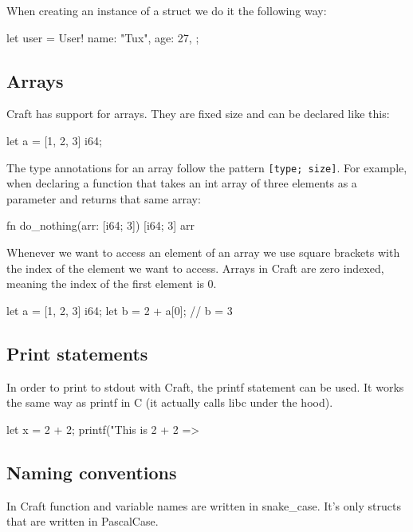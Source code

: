 ﻿\documentclass[10pt,a4paper,twocolumn,twoside]{article}
\begin{document}
When creating an instance of a struct we do it the following way:

\begin{code}
    let user = User!{
        name: "Tux",
        age: 27,
    };
\end{code}

\subsection{Arrays}
Craft has support for arrays. They are fixed size and can be declared like this:

\begin{code}
let a = [1, 2, 3] i64;
\end{code}

The type annotations for an array follow the pattern \texttt{[type; size]}. 
For example, when declaring a function that takes an int array of three elements
as a parameter and returns that same array:

\begin{code}
fn do_nothing(arr: [i64; 3]) [i64; 3] {
    arr
}
\end{code}

Whenever we want to access an element of an array we use square brackets with 
the index of the element we want to access. Arrays in Craft are zero indexed, 
meaning the index of the first element is 0.

\begin{code}
let a = [1, 2, 3] i64;
let b = 2 + a[0]; // b = 3
\end{code}

\subsection{Print statements}
In order to print to stdout with Craft, the printf statement can be used. It
works the same way as printf in C (it actually calls libc under the hood).

\begin{code}
    let x = 2 + 2;
    printf("This is 2 + 2 => %
\end{code}

\subsection{Naming conventions}
In Craft function and variable names are written in snake\_case. It's 
only structs that are written in PascalCase.
\end{document}
